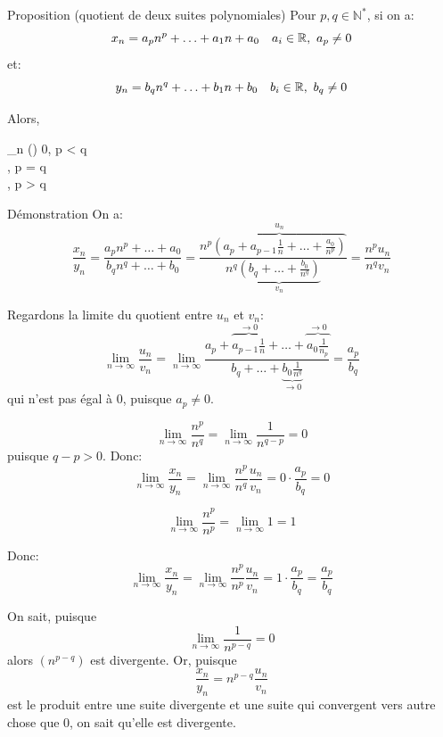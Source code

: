 \documentclass[a4paper]{article}
\begin{document}
\begin{parag}{Proposition (quotient de deux suites polynomiales)}
    Pour $p, q \in \mathbb{N}^*$, si on a:
    \[x_n = a_p n^p + \ldots + a_1 n + a_0 \quad a_i \in \mathbb{R},\ a_p \neq 0\]
    et: 
    \[y_n = b_q n^q + \ldots + b_1 n + b_0 \quad b_i \in \mathbb{R},\ b_q \neq 0\]
    
    Alors,
    \begin{functionbypart}{\lim_{n \to \infty} \left(\right)}
    0, \mathspace {} p < q \\
    , \mathspace {} p = q \\
    , \mathspace {} p > q
    \end{functionbypart}
    
    \begin{subparag}{Démonstration}
        On a: 
        \[\frac{x_n}{y_n} = \frac{a_p n^p + \ldots + a_0}{b_q n^q + \ldots + b_0} = \frac{n^p \overbrace{\left(a_p + a_{p-1} \frac{1}{n} + \ldots + \frac{a_0}{n^p}\right)}^{u_{n}}}{n^q \underbrace{\left(b_q + \ldots + \frac{b_0}{n^q}\right)}_{v_n}} = \frac{n^p u_n}{n^q v_n}\]
        
        Regardons la limite du quotient entre $u_n$ et $v_n$: 
        \[\lim_{n \to \infty} \frac{u_n}{v_n} = \lim_{n \to \infty} \frac{a_p + \overbrace{a_{p-1} \frac{1}{n} }^{\to 0}+ \ldots + \overbrace{a_0 \frac{1}{n_p}}^{\to 0}}{b_q + \ldots + \underbrace{b_0 \frac{1}{n^q}}_{\to 0}} = \frac{a_p}{b_q}\]
        qui n'est pas égal à 0, puisque $a_p \neq 0$. 

    \[\lim_{n \to \infty} \frac{n^p}{n^q} = \lim_{n \to \infty} \frac{1}{n^{q - p}} = 0\]
        puisque $q - p > 0$. Donc: 
        \[\lim_{n \to \infty} \frac{x_n}{y_n} = \lim_{n \to \infty} \frac{n^p}{n^q} \frac{u_n}{v_n} = 0\cdot \frac{a_p}{b_q} = 0\]
        
        \[\lim_{n \to \infty} \frac{n^p}{n^p} = \lim_{n \to \infty} 1 = 1 \]
        
        Donc:
        \[\lim_{n \to \infty} \frac{x_n}{y_n} = \lim_{n \to \infty} \frac{n^p}{n^p} \frac{u_n}{v_n} = 1 \cdot \frac{a_p}{b_q} = \frac{a_p}{b_q}\]
        
         On sait, puisque 
        \[\lim_{n \to \infty} \frac{1}{n^{p-q}} = 0\]
        alors $\left(n^{p - q}\right)$ est divergente. Or, puisque 
        \[\frac{x_n}{y_n} = n^{p - q} \frac{u_n}{v_n}\]
        est le produit entre une suite divergente et une suite qui convergent vers autre chose que 0, on sait qu'elle est divergente.
    \end{subparag}
    
\end{parag}
\end{document}
